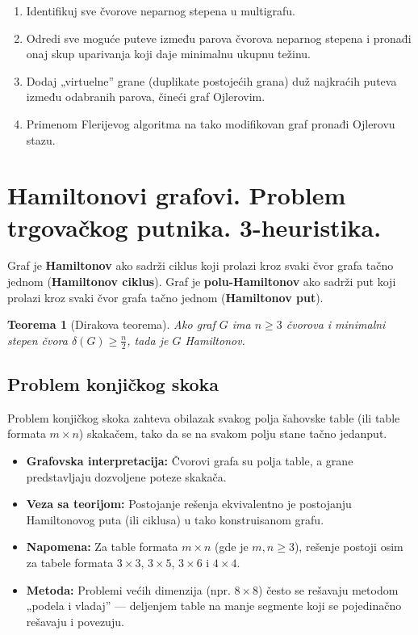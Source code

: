 \documentclass[a4paper,12pt]{article}
\numberwithin{algorithm}{section}
\theoremstyle{plain}
\newtheorem{theorem}{Teorema}[section]
\theoremstyle{definition}
\theoremstyle{remark}
\begin{document}
\begin{algorithm}[!h]
    \caption{Rešavanje problema kineskog poštara (za neojlerov graf)}
    \begin{enumerate}
        \item Identifikuj sve čvorove neparnog stepena u multigrafu.
        \item Odredi sve moguće puteve između parova čvorova neparnog stepena i pronađi onaj skup uparivanja koji daje minimalnu ukupnu težinu.
        \item Dodaj „virtuelne” grane (duplikate postojećih grana) duž najkraćih puteva između odabranih parova, čineći graf Ojlerovim.
        \item Primenom Flerijevog algoritma na tako modifikovan graf pronađi Ojlerovu stazu.
    \end{enumerate}
\end{algorithm}


\section{Hamiltonovi grafovi. Problem trgovačkog putnika. 3-heuristika. }
Graf je \textbf{Hamiltonov} ako sadrži ciklus koji prolazi kroz svaki čvor grafa tačno jednom (\textbf{Hamiltonov ciklus}). Graf je \textbf{polu-Hamiltonov} ako sadrži put koji prolazi kroz svaki čvor grafa tačno jednom (\textbf{Hamiltonov put}).

\begin{theorem}[Dirakova teorema]
    Ako graf $G$ ima $n \geq 3$ čvorova i minimalni stepen čvora $\delta(G) \geq \frac{n}{2}$, tada je $G$ Hamiltonov.
\end{theorem}



\subsection{Problem konjičkog skoka}
Problem konjičkog skoka zahteva obilazak svakog polja šahovske table (ili table formata $m \times n$) skakačem, tako da se na svakom polju stane tačno jedanput.

\begin{itemize}
    \item \textbf{Grafovska interpretacija:} Čvorovi grafa su polja table, a grane predstavljaju dozvoljene poteze skakača.
    \item \textbf{Veza sa teorijom:} Postojanje rešenja ekvivalentno je postojanju Hamiltonovog puta (ili ciklusa) u tako konstruisanom grafu.
    \item \textbf{Napomena:} Za table formata $m \times n$ (gde je $m, n \geq 3$), rešenje postoji osim za tabele formata $3 \times 3$, $3 \times 5$, $3 \times 6$ i $4 \times 4$.
    \item \textbf{Metoda:} Problemi većih dimenzija (npr. $8 \times 8$) često se rešavaju metodom „podela i vladaj” — deljenjem table na manje segmente koji se pojedinačno rešavaju i povezuju.
\end{itemize}
\end{document}
